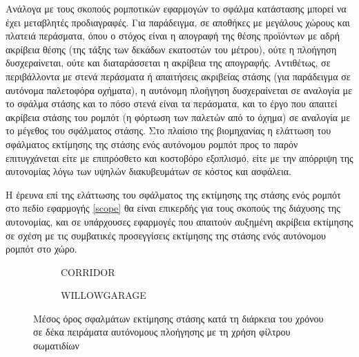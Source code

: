 Ανάλογα με τους σκοπούς ρομποτικών εφαρμογών το σφάλμα κατάστασης μπορεί να
έχει μεταβλητές προδιαγραφές. Για παράδειγμα, σε αποθήκες με μεγάλους χώρους και
πλατειά περάσματα, όπου ο στόχος είναι η απογραφή της θέσης προϊόντων με αδρή
ακρίβεια θέσης (της τάξης των δεκάδων εκατοστών του μέτρου), ούτε η πλοήγηση
δυσχεραίνεται, ούτε και διαταράσσεται η ακρίβεια της απογραφής. Αντιθέτως,
σε περιβάλλοντα με στενά περάσματα ή απαιτήσεις ακριβείας στάσης (για παράδειγμα
σε αυτόνομα παλετοφόρα οχήματα), η αυτόνομη πλοήγηση δυσχεραίνεται σε αναλογία
με το σφάλμα στάσης και το πόσο στενά είναι τα περάσματα, και το έργο που
απαιτεί ακρίβεια στάσης του ρομπότ (η φόρτωση των παλετών από το όχημα) σε
αναλογία με το μέγεθος του σφάλματος στάσης. Στο πλαίσιο της βιομηχανίας η
ελάττωση του σφάλματος εκτίμησης της στάσης ενός αυτόνομου ρομπότ προς το παρόν
επιτυγχάνεται είτε με επιπρόσθετο και κοστοβόρο εξοπλισμό, είτε με την απόρριψη
της αυτονομίας λόγω των υψηλών διακυβευμάτων σε κόστος και ασφάλεια.

Η έρευνα επί της ελάττωσης του σφάλματος της εκτίμησης της στάσης ενός ρομπότ
στο πεδίο εφαρμογής \ref{scope} θα είναι επικερδής για τους σκοπούς της
διάχυσης της αυτονομίας, και σε υπάρχουσες εφαρμογές που απαιτούν αυξημένη
ακρίβεια εκτίμησης σε σχέση με τις συμβατικές προσεγγίσεις εκτίμησης της στάσης
ενός αυτόνομου ρομπότ στο χώρο.

\begin{figure}[h]\vspace{1cm}\centering
   \begin{subfigure}{0.49\linewidth}\centering
     
     \vspace{0.75cm}
     \caption{\small CORRIDOR}
   \end{subfigure}
   \begin{subfigure}{0.49\linewidth} \centering
     
     \vspace{0.75cm}
     \caption{\small WILLOWGARAGE}
   \end{subfigure}
\caption{\small Μέσος όρος σφαλμάτων εκτίμησης στάσης κατά τη διάρκεια του
         χρόνου σε δέκα πειράματα αυτόνομους πλοήγησης με τη χρήση φίλτρου
         σωματιδίων}
\label{fig:02_01_05}
\end{figure}
